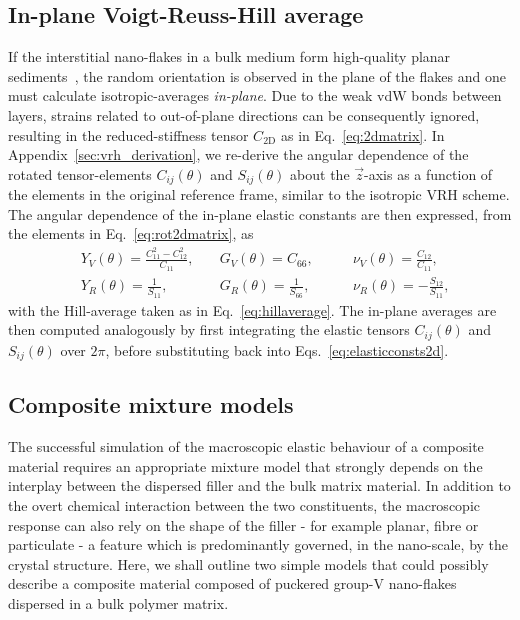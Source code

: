 \subsection{In-plane Voigt-Reuss-Hill average}
\label{sec:in_plane_vrh_scheme}
%
If the interstitial nano-flakes in a bulk medium 
form high-quality planar sediments~\cite{PMID:26469634,PMID:23203296,Mahmoud20111534,ADFM:ADFM200801776,APP:APP38645,Young20121459,Yang2013,C4NR01208A}, 
the random orientation is observed
in the plane of the flakes 
and one must calculate 
isotropic-averages {\it in-plane}. 
%
Due to the weak vdW bonds 
between layers, 
strains related to out-of-plane directions 
can be consequently ignored, 
resulting in the reduced-stiffness tensor $C_\textrm{2D}$ 
as in Eq.~\eqref{eq:2dmatrix}.
%
In Appendix~\ref{sec:vrh_derivation}, 
we re-derive the angular dependence  
of the rotated tensor-elements 
$C_{ij}\left(\theta\right)$ and $S_{ij}\left(\theta\right)$
about the $\vec{z}$-axis 
as a function of the elements in the original 
reference frame, 
similar to the isotropic VRH scheme.
%  
The angular dependence of the in-plane  
elastic constants are then expressed, 
from the elements in Eq.~\eqref{eq:rot2dmatrix}, as     
%
\begin{equation}
\begin{aligned}
&Y_{V}\left(\theta\right)=\frac{C_{11}^2-C_{12}^2}{C_{11}},
\quad
&G_{V}\left(\theta\right)=C_{66},
\quad\quad
&\nu_{V}\left(\theta\right)=\frac{C_{12}}{C_{11}},
\\[0.75em]
&Y_{R}\left(\theta\right)=\frac{1}{S_{11}},
\quad
&G_{R}\left(\theta\right)=\frac{1}{S_{66}},
\quad\quad
&\nu_{R}\left(\theta\right)=-\frac{S_{12}}{S_{11}},
\end{aligned}
\label{eq:elasticconsts2d}
\end{equation}
%
with the Hill-average taken as in Eq.~\eqref{eq:hillaverage}.
%
The in-plane averages are then 
computed analogously 
by first integrating the elastic tensors 
$C_{ij}\left(\theta\right)$ and $S_{ij}\left(\theta\right)$ 
over $2\pi$, 
 before substituting back into Eqs.~\eqref{eq:elasticconsts2d}.

\subsection{Composite mixture models}
\label{sec:mixture_models}

The successful simulation of 
the macroscopic elastic behaviour
 of a composite material  
requires an appropriate mixture model 
that strongly depends on the interplay  
between the dispersed filler 
and the bulk matrix material. 
%
In addition to the overt chemical interaction 
between the two constituents, 
the macroscopic response 
can also rely on the shape of the filler -  
for example planar, fibre or particulate - 
a feature which is predominantly governed, 
in the nano-scale, 
by the crystal structure.
%
Here, we shall outline two simple models 
that could possibly describe a 
composite material composed of 
puckered group-V nano-flakes dispersed 
in a bulk polymer matrix.

